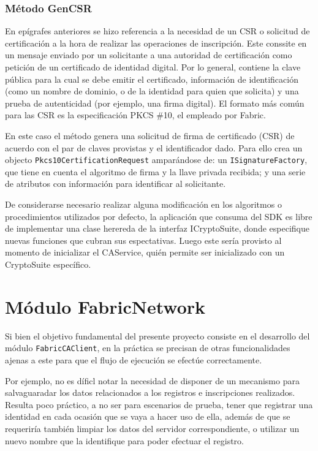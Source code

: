 \subsubsection{M\'etodo GenCSR}
En ep\'igrafes anteriores se hizo referencia a la necesidad de un CSR o solicitud de certificación a la hora de realizar las operaciones de inscripci\'on. Este conssite en un mensaje enviado por un solicitante a una autoridad de certificación como petici\'on de un certificado de identidad digital. Por lo general, contiene la clave pública para la cual se debe emitir el certificado, información de identificación (como un nombre de dominio, o de la identidad para quien que solicita) y una prueba de autenticidad (por ejemplo, una firma digital). El formato más común para las CSR es la especificación PKCS \#10, el empleado por Fabric.

En este caso el m\'etodo genera una solicitud de firma de certificado (CSR) de acuerdo con el par de claves provistas y el identificador dado. Para ello crea un objecto \texttt{Pkcs10CertificationRequest} ampar\'andose de: un \texttt{ISignatureFactory}, que tiene en cuenta el algoritmo de firma y la llave privada recibida; y una serie de atributos con información para identificar al solicitante.



De considerarse necesario realizar alguna modificaci\'on en los algoritmos o procedimientos utilizados por defecto, la aplicaci\'on que consuma del SDK es libre de implementar una clase herereda de la interfaz ICryptoSuite, donde especifique nuevas funciones que cubran sus espectativas. Luego este ser\'ia provisto al momento de inicializar el CAService, qui\'en permite ser inicializado con un CryptoSuite espec\'ifico.

\section{M\'odulo FabricNetwork}
Si bien el objetivo fundamental del presente proyecto consiste en el desarrollo del m\'odulo \texttt{FabricCAClient}, en la pr\'actica se precisan de otras funcionalidades ajenas a este para que el flujo de ejecuci\'on se efect\'ue correctamente.

Por ejemplo, no es d\'ificl notar la necesidad de disponer de un mecanismo para salvaguaradar los datos relacionados a los registros e inscripciones realizados. Resulta poco pr\'actico, a no ser para escenarios de prueba, tener que registrar una identidad en cada ocasi\'on que se vaya a hacer uso de ella, adem\'as de que se requerir\'ia tambi\'en limpiar los datos del servidor correspondiente, o utilizar un nuevo nombre que la identifique para poder efectuar el registro. %

